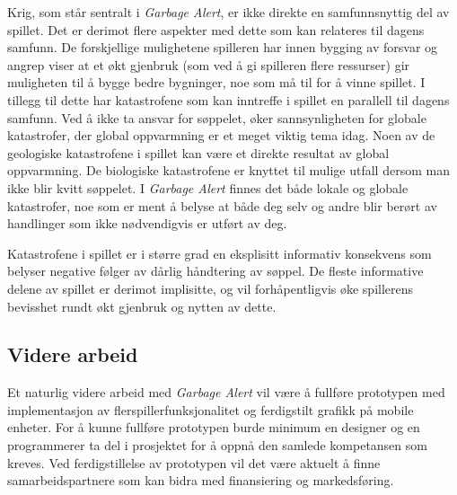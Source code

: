 Krig, som står sentralt i \emph{Garbage Alert}, er ikke direkte en samfunnsnyttig del av spillet. Det er derimot flere aspekter med dette som kan relateres til dagens samfunn. De forskjellige mulighetene spilleren har innen bygging av forsvar og angrep viser at et økt gjenbruk (som ved å gi spilleren flere ressurser) gir muligheten til å bygge bedre bygninger, noe som må til for å vinne spillet. I tillegg til dette har katastrofene som kan inntreffe i spillet en parallell til dagens samfunn. Ved å ikke ta ansvar for søppelet, øker sannsynligheten for globale katastrofer, der global oppvarmning er et meget viktig tema idag. Noen av de geologiske katastrofene i spillet kan være et direkte resultat av global oppvarmning. De biologiske katastrofene er knyttet til mulige utfall dersom man ikke blir kvitt søppelet. I \emph{Garbage Alert} finnes det både lokale og globale katastrofer, noe som er ment å belyse at både deg selv og andre blir berørt av handlinger som ikke nødvendigvis er utført av deg.

Katastrofene i spillet er i større grad en eksplisitt informativ konsekvens som belyser negative følger av dårlig håndtering av søppel. De fleste informative delene av spillet er derimot implisitte, og vil forhåpentligvis øke spillerens bevisshet rundt økt gjenbruk og nytten av dette. 

\subsection{Videre arbeid}
Et naturlig videre arbeid med \emph{Garbage Alert} vil være å fullføre prototypen med implementasjon av flerspillerfunksjonalitet og ferdigstilt grafikk på mobile enheter. For å kunne fullføre prototypen burde minimum en designer og en programmerer ta del i prosjektet for å oppnå den samlede kompetansen som kreves. Ved ferdigstillelse av prototypen vil det være aktuelt å finne samarbeidspartnere som kan bidra med finansiering og markedsføring.
